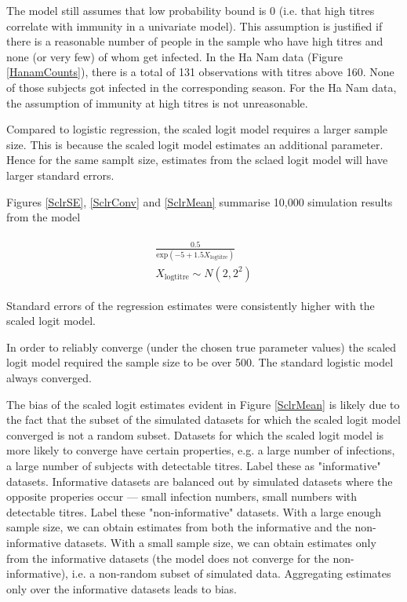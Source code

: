 The model still assumes that low probability bound is 0 (i.e. that high titres correlate with immunity in a univariate model). This assumption is justified if there is a reasonable number of people in the sample who have high titres and none (or very few) of whom get infected. In the Ha Nam data (Figure \ref{HanamCounts}), there is a total of 131 observations with titres above 160. None of those subjects got infected in the corresponding season. For the Ha Nam data, the assumption of immunity at high titres is not unreasonable.

Compared to logistic regression, the scaled logit model requires a larger sample size. This is because the scaled logit model estimates an additional parameter. Hence for the same samplt size, estimates from the sclaed logit model will have larger standard errors. 

Figures \ref{SclrSE}, \ref{SclrConv} and \ref{SclrMean} summarise 10,000 simulation results from the model 

\begin{align*}
\begin{gathered}
\frac{0.5}{\text{exp}(-5 + 1.5 X_{\text{logtitre}})} \\
X_{\text{logtitre}} \sim N(2, 2^2)
\end{gathered}
\end{align*}

Standard errors of the regression estimates were consistently higher with the scaled logit model.

In order to reliably converge (under the chosen true parameter values) the scaled logit model required the sample size to be over 500. The standard logistic model always converged.

The bias of the scaled logit estimates evident in Figure \ref{SclrMean} is likely due to the fact that the subset of the simulated datasets for which the scaled logit model converged is not a random subset. Datasets for which the scaled logit model is more likely to converge have certain properties, e.g. a large number of infections, a large number of subjects with detectable titres. Label these as "informative" datasets. Informative datasets are balanced out by simulated datasets where the opposite properies occur --- small infection numbers, small numbers with detectable titres. Label these "non-informative" datasets. With a large enough sample size, we can obtain estimates from both the informative and the non-informative datasets. With a small sample size, we can obtain estimates only from the informative datasets (the model does not converge for the non-informative), i.e. a non-random subset of simulated data. Aggregating estimates only over the informative datasets leads to bias.

